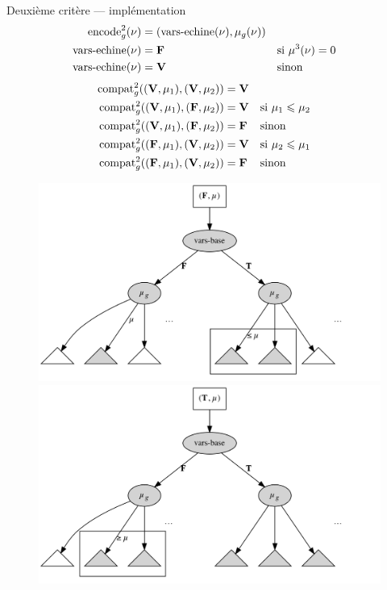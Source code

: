 \documentclass[serif]{beamer}
\newcommand{\mathhyphen}{{\hbox{-}}}
\begin{document}

\begin{frame}{Deuxième critère — implémentation}
\tiny
\begin{align*}
		\mathrm{encode}^2_g (\nu) &=
		(\mathrm{vars\mathhyphen echine} (\nu), \mu_g (\nu))
	\\
		\mathrm{vars\mathhyphen echine} (\nu) &=
		\bold{F} &&
		\text{si } \mu^3 (\nu) = 0
	\\
		\mathrm{vars\mathhyphen echine} (\nu) &=
		\bold{V} &&
		\text{sinon}
\end{align*}
\begin{align*}
		\mathrm{compat}^2_g ((\bold{V}, \mu_1), (\bold{V}, \mu_2)) &=
		\bold{V}
	\\
		\mathrm{compat}^2_g ((\bold{V}, \mu_1), (\bold{F}, \mu_2)) &=
		\bold{V} &&
		\text{si } \mu_1 \leqslant \mu_2
	\\
		\mathrm{compat}^2_g ((\bold{V}, \mu_1), (\bold{F}, \mu_2)) &=
		\bold{F} &&
		\text{sinon}
	\\
		\mathrm{compat}^2_g ((\bold{F}, \mu_1), (\bold{V}, \mu_2)) &=
		\bold{V} &&
		\text{si } \mu_2 \leqslant \mu_1
	\\
		\mathrm{compat}^2_g ((\bold{F}, \mu_1), (\bold{V}, \mu_2)) &=
		\bold{F} &&
		\text{sinon}
\end{align*}
\begin{figure}[h]
	\centering
	\includegraphics[scale=0.09]{graphs/crit2_1}
	\includegraphics[scale=0.09]{graphs/crit2_2}
\end{figure}
\end{frame}
\end{document}
